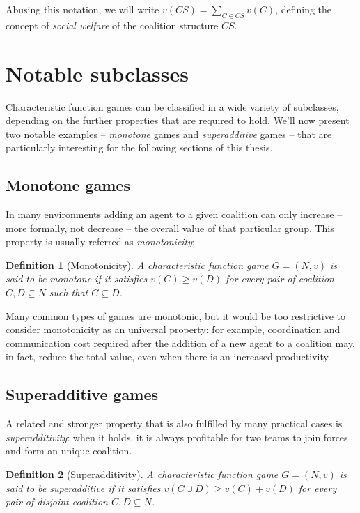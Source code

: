 \documentclass[11pt, twoside, titlepage, a4paper, openright]{report}
\newtheorem{Def}{Definition}
\begin{document}
\noindent Abusing this notation, we will write $v(CS)=\sum_{C \in CS}v(C)$, defining the concept of \textit{social welfare} of the coalition structure $CS$.

\section{Notable subclasses}\label{subsec:subclass}

Characteristic function games can be classified in a wide variety of subclasses, depending on the further properties that are required to hold. We'll now present two notable examples -- \textit{monotone} games and \textit{superadditive} games -- that are particularly interesting for the following sections of this thesis.

\subsection{Monotone games}

In many environments adding an agent to a given coalition can only increase -- more formally, not decrease -- the overall value of that particular group. This property is usually referred as \textit{monotonicity}:

\begin{Def}[Monotonicity]
A characteristic function game $G=(N,v)$ is said to be \textit{monotone} if it satisfies $v(C) \geq v(D)$ for every pair of coalition $C,D \subseteq N$ such that $C \subseteq D$.
\end{Def}

\noindent Many common types of games are monotonic, but it would be too restrictive to consider monotonicity as an universal property: for example, coordination and communication cost required after the addition of a new agent to a coalition may, in fact, reduce the total value, even when there is an increased productivity.

\subsection{Superadditive games}\label{sec:superaddgames}

A related and stronger property that is also fulfilled by many practical cases is \textit{superadditivity}: when it holds, it is always profitable for two teams to join forces and form an unique coalition.

\begin{Def}[Superadditivity] \label{def:superadd}
A characteristic function game $G=(N,v)$ is said to be \textit{superadditive} if it satisfies $v(C \cup D) \geq v(C) + v(D)$ for every pair of disjoint coalition $C,D \subseteq N$.
\end{Def}
\end{document}
